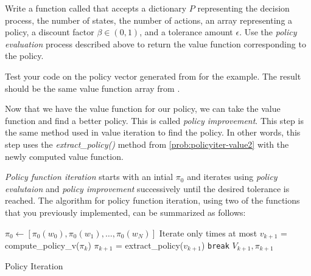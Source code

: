 \begin{problem}
\label{prob:policyiter-value3}
Write a function called  that accepts a dictionary $P$ representing the decision process, the number of states, the number of actions, an array representing a policy, a discount factor $\beta \in (0,1)$, and a tolerance amount $\epsilon$.
Use the \emph{policy evaluation} process described above to return the value function corresponding to the policy.

Test your code on the policy vector generated from  for the example.
The result should be the same value function array from .
\end{problem}

Now that we have the value function for our policy, we can take the value function and find a better policy.
This is called \emph{policy improvement}. 
This step is the same method used in value iteration to find the policy. 
In other words, this step uses the \emph{extract\_policy()} method from \ref{prob:policyiter-value2} with the newly computed value function.

\emph{Policy function iteration} starts with an intial $\pi_{0}$ and iterates using \emph{policy evalutaion} and \emph{policy improvement} successively until the desired tolerance is reached.
The algorithm for policy function iteration, using two of the functions that you previously implemented, can be summarized as follows:

\begin{algorithm}[H]
\begin{algorithmic}[1]
    \State $\pi_0 \gets [\pi_0(w_0),\pi_0(w_1),\ldots,\pi_0(w_N)] $
        \Comment Iterate only  times at most
        \State $v_{k+1}$ = compute\_policy\_v($\pi_{k}$)
        \State $\pi_{k+1}$ = extract\_policy($v_{k+1}$)
            \State \texttt{break}
        \EndIf
    \EndFor
    \State {} $V_{k+1}, \pi_{k+1}$
\EndProcedure
\end{algorithmic}
\caption{Policy Iteration}
\label{alg:PolicyIteration}
\end{algorithm}

